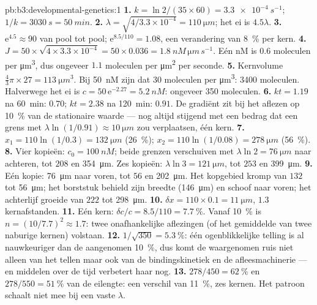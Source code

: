 \begin{solution}{pb:b3:developmental-genetics:1}
\textbf{1.} $k = \ln 2/(35\times 60) = \qty{3.3e-4}{s^{-1}}$; $1/k =
\qty{3030}{s} = \qty{50}{min}$.
\textbf{2.} $\lambda = \sqrt{4/3.3\times 10^{-4}} = \qty{110}{\micro m}$;
het ei is $4.5\lambda$.
\textbf{3.} $\mathrm{e}^{4.5} \approx 90$ van pool tot pool;
$\mathrm{e}^{8.5/110} = 1.08$, een verandering van \qty{8}{\%} per kern.
\textbf{4.} $J = 50\times\sqrt{4\times 3.3\times 10^{-4}} = 50\times
0.036 = \qty{1.8}{nM\,\micro m\,s^{-1}}$. Eén nM is $0.6$ moleculen per
\unit{\micro m^3}, dus ongeveer $1.1$ moleculen per \unit{\micro m^2}
per seconde.
\textbf{5.} Kernvolume $\tfrac{4}{3}\pi\times 27 = \qty{113}{\micro
m^3}$. Bij \qty{50}{nM} zijn dat $30$ moleculen per \unit{\micro m^3}:
\num{3400} moleculen. Halverwege het ei is $c = 50\,\mathrm{e}^{-2.27} =
\qty{5.2}{nM}$: ongeveer \num{350} moleculen.
\textbf{6.} $kt = 1.19$ na \qty{60}{min}: $0.70$; $kt = 2.38$ na
\qty{120}{min}: $0.91$. De gradiënt zit bij het aflezen op
\qty{10}{\%} van de stationaire waarde --- nog altijd stijgend met een
bedrag dat een grens met $\lambda\ln(1/0.91) \approx \qty{10}{\micro m}$
zou verplaatsen, één kern.
\textbf{7.} $x_{1} = 110\ln(1/0.3) = \qty{132}{\micro m}$
(\qty{26}{\%}); $x_{2} = 110\ln(1/0.08) = \qty{278}{\micro m}$
(\qty{56}{\%}).
\textbf{8.} Vier kopieën: $c_{0} = \qty{100}{nM}$; beide grenzen
verschuiven met $\lambda\ln 2 = \qty{76}{\micro m}$ naar achteren, tot
$208$ en \qty{354}{\micro m}. Zes kopieën: $\lambda\ln 3 = \qty{121}{\micro m}$,
tot $253$ en \qty{399}{\micro m}.
\textbf{9.} Eén kopie: \qty{76}{\micro m} naar voren, tot $56$ en
\qty{202}{\micro m}. Het kopgebied kromp van $132$ tot
\qty{56}{\micro m}; het borststuk behield zijn breedte
(\qty{146}{\micro m}) en schoof naar voren; het achterlijf groeide van
$222$ tot \qty{298}{\micro m}.
\textbf{10.} $\delta x = 110\times 0.1 = \qty{11}{\micro m}$, $1.3$
kernafstanden.
\textbf{11.} Eén kern: $\delta c/c = 8.5/110 = \qty{7.7}{\%}$. Vanaf
\qty{10}{\%} is $n = (10/7.7)^{2} \approx 1.7$: twee onafhankelijke
aflezingen (of het gemiddelde van twee naburige kernen) volstaan.
\textbf{12.} $1/\sqrt{350} = \qty{5.3}{\%}$: één ogenblikkelijke
telling is al nauwkeuriger dan de aangenomen \qty{10}{\%}, dus komt de
waargenomen ruis niet alleen van het tellen maar ook van de
bindingskinetiek en de afleesmachinerie --- en middelen over de tijd
verbetert haar nog.
\textbf{13.} $278/450 = \qty{62}{\%}$ en $278/550 = \qty{51}{\%}$ van de
eilengte: een verschil van \qty{11}{\%}, zes kernen. Het patroon
schaalt niet mee bij een vaste $\lambda$.

\end{solution}
